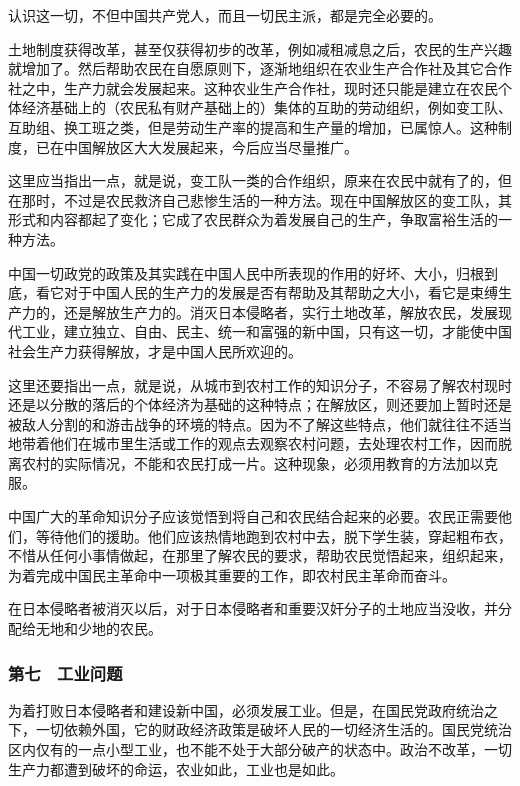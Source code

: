 认识这一切，不但中国共产党人，而且一切民主派，都是完全必要的。

土地制度获得改革，甚至仅获得初步的改革，例如减租减息之后，农民的生产兴趣就增加了。然后帮助农民在自愿原则下，逐渐地组织在农业生产合作社及其它合作社之中，生产力就会发展起来。这种农业生产合作社，现时还只能是建立在农民个体经济基础上的（农民私有财产基础上的）集体的互助的劳动组织，例如变工队、互助组、换工班之类，但是劳动生产率的提高和生产量的增加，已属惊人。这种制度，已在中国解放区大大发展起来，今后应当尽量推广。

这里应当指出一点，就是说，变工队一类的合作组织，原来在农民中就有了的，但在那时，不过是农民救济自己悲惨生活的一种方法。现在中国解放区的变工队，其形式和内容都起了变化；它成了农民群众为着发展自己的生产，争取富裕生活的一种方法。

中国一切政党的政策及其实践在中国人民中所表现的作用的好坏、大小，归根到底，看它对于中国人民的生产力的发展是否有帮助及其帮助之大小，看它是束缚生产力的，还是解放生产力的。消灭日本侵略者，实行土地改革，解放农民，发展现代工业，建立独立、自由、民主、统一和富强的新中国，只有这一切，才能使中国社会生产力获得解放，才是中国人民所欢迎的。

这里还要指出一点，就是说，从城市到农村工作的知识分子，不容易了解农村现时还是以分散的落后的个体经济为基础的这种特点；在解放区，则还要加上暂时还是被敌人分割的和游击战争的环境的特点。因为不了解这些特点，他们就往往不适当地带着他们在城市里生活或工作的观点去观察农村问题，去处理农村工作，因而脱离农村的实际情况，不能和农民打成一片。这种现象，必须用教育的方法加以克服。

中国广大的革命知识分子应该觉悟到将自己和农民结合起来的必要。农民正需要他们，等待他们的援助。他们应该热情地跑到农村中去，脱下学生装，穿起粗布衣，不惜从任何小事情做起，在那里了解农民的要求，帮助农民觉悟起来，组织起来，为着完成中国民主革命中一项极其重要的工作，即农村民主革命而奋斗。

在日本侵略者被消灭以后，对于日本侵略者和重要汉奸分子的土地应当没收，并分配给无地和少地的农民。

\subsubsection{第七　工业问题}

为着打败日本侵略者和建设新中国，必须发展工业。但是，在国民党政府统治之下，一切依赖外国，它的财政经济政策是破坏人民的一切经济生活的。国民党统治区内仅有的一点小型工业，也不能不处于大部分破产的状态中。政治不改革，一切生产力都遭到破坏的命运，农业如此，工业也是如此。

